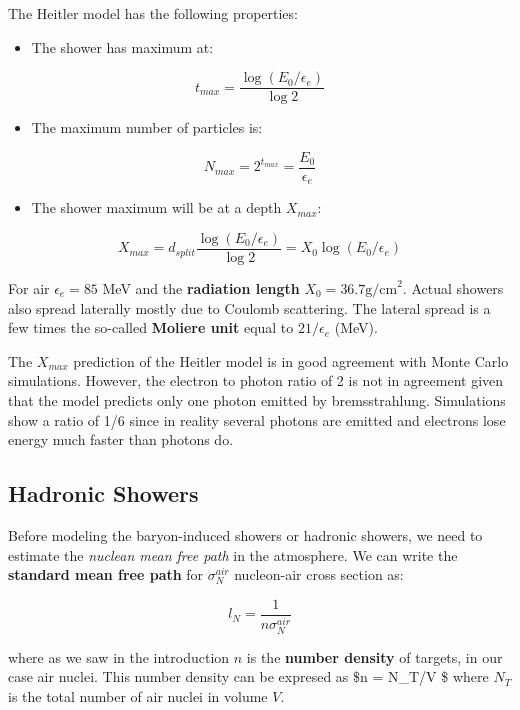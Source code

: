 \documentclass[
  letterpaper,
  DIV=11,
  numbers=noendperiod]{scrreprt}
\providecommand{\tightlist}{%
  \setlength{\itemsep}{0pt}\setlength{\parskip}{0pt}}\usepackage{longtable,booktabs,array}
\begin{document}
The Heitler model has the following properties:

\begin{itemize}
\tightlist
\item
  The shower has maximum at:
\end{itemize}

\[t_{max} = \frac{\log(E_0/\epsilon_e)}{\log2}\]

\begin{itemize}
\tightlist
\item
  The maximum number of particles is:
\end{itemize}

\[N_{max} = 2^{t_{max}} = \frac{E_0}{\epsilon_e}\]

\begin{itemize}
\tightlist
\item
  The shower maximum will be at a depth \(X_{max}\):
\end{itemize}

\[X_{max}=d_{split} \frac{\log(E_0/\epsilon_e)}{\log2} = X_0 \log(E_0/\epsilon_e)\]

For air \(\epsilon_e = 85\) MeV and the \textbf{radiation length}
\(X_0 = 36.7 \mathrm{ g/cm}^2\). Actual showers also spread laterally
mostly due to Coulomb scattering. The lateral spread is a few times the
so-called \textbf{Moliere unit} equal to \(21/\epsilon_e\) (MeV).

The \(X_{max}\) prediction of the Heitler model is in good agreement
with Monte Carlo simulations. However, the electron to photon ratio of 2
is not in agreement given that the model predicts only one photon
emitted by bremsstrahlung. Simulations show a ratio of 1/6 since in
reality several photons are emitted and electrons lose energy much
faster than photons do.

\subsection{Hadronic Showers}\label{hadronic-showers}

Before modeling the baryon-induced showers or hadronic showers, we need
to estimate the \emph{nuclean mean free path} in the atmosphere. We can
write the \textbf{standard mean free path} for \(\sigma^{air}_N\)
nucleon-air cross section as:

\[l_N = \frac{1}{n \sigma_N^{air}}\]

where as we saw in the introduction \(n\) is the \textbf{number density}
of targets, in our case air nuclei. This number density can be expresed
as \$n = N\_T/V \$ where \(N_T\)is the total number of air nuclei in
volume \(V\).
\end{document}
